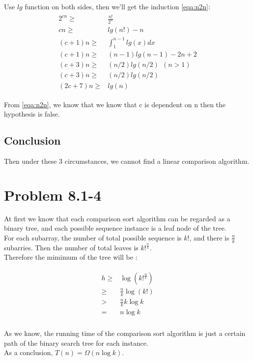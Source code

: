 \documentclass[oneside]{homework} %
\begin{document}
Use $lg$ function on both sides, then we'll get the induction \ref{eqa:n2n}:
\begin{eqnarray}
  \begin{split}
	2^{cn} \geq& \frac{n!}{2^{n}}  \\
	cn \geq& lg(n!) - n \\
	(c+1)n \geq& \int_{1}^{n-1}lg(x)dx  \\
	(c+1)n \geq& (n-1)lg(n-1) - 2n +2 \\
	(c+3)n \geq& (n/2)lg(n/2) ~ ~ (n>1)\\
	(c+3)n \geq& (n/2)lg(n/2) \\
	(2c+7)n \geq& lg(n)
  \end{split}
  \label{eqa:n2n}
\end{eqnarray}

From \ref{eqa:n2n}, we know that we know that c is dependent on n then the hypothesis is false.

\subsection{Conclusion}
Then under these 3 circumstances, we cannot find a linear comparison algorithm.


\section{Problem 8.1-4}
At first we know that each comparison sort algorithm can be regarded as a binary tree, and each possible sequence instance is a leaf node of the tree. \\ For each subarray, the number of total possible sequence is $k!$, and there is $\frac{n}{k}$ subarries.
Then the number of total leaves is $k!^{\frac{n}{k}}$. \\
Therefore the mimimum of the tree will be :

\begin{eqnarray}
  \begin{split}
	 h \geq& \log (k!^{\frac{n}{k}})  \\
	 \geq& \frac{n}{k}\log (k!)  \\
	 >& \frac{n}{k}k\log k  \\
	 =& n\log k  \\
  \end{split}
  \label{eqa:ksub}
\end{eqnarray}

As we know, the running time of the comparison sort algorithm is just a certain path of the binary search tree for each instance.
\\ As a conclusion, $T(n) = \Omega(n \log k)$.
\end{document}
